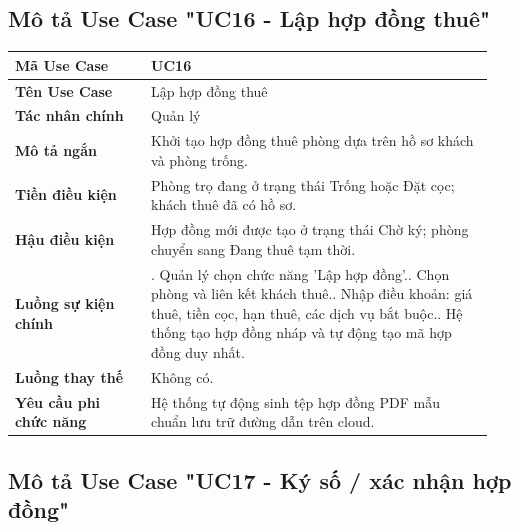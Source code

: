 \subsection{Mô tả Use Case "UC16 - Lập hợp đồng thuê"}

\begin{longtable}[]{@{}>{\RaggedRight\arraybackslash}p{0.27\linewidth}>{\RaggedRight\arraybackslash}p{0.68\linewidth}@{}}
\toprule
\textbf{Mã Use Case} & UC16\tabularnewline
\midrule
\endhead
\textbf{Tên Use Case} & Lập hợp đồng thuê\tabularnewline
\textbf{Tác nhân chính} & Quản lý\tabularnewline
\textbf{Mô tả ngắn} & Khởi tạo hợp đồng thuê phòng dựa trên hồ sơ khách
và phòng trống.\tabularnewline
\textbf{Tiền điều kiện} & Phòng trọ đang ở trạng thái Trống hoặc Đặt
cọc; khách thuê đã có hồ sơ.\tabularnewline
\textbf{Hậu điều kiện} & Hợp đồng mới được tạo ở trạng thái Chờ ký;
phòng chuyển sang Đang thuê tạm thời.\tabularnewline
\textbf{Luồng sự kiện chính} & 1. Quản lý chọn chức
năng 'Lập hợp đồng'.\newline 2. Chọn phòng và liên kết khách
thuê.\newline 3. Nhập điều khoản: giá thuê, tiền cọc, hạn thuê, các
dịch vụ bắt buộc.\newline 4. Hệ thống tạo hợp đồng nháp và tự động
tạo mã hợp đồng duy nhất.\tabularnewline
\textbf{Luồng thay thế} & Không có.\tabularnewline
\textbf{Yêu cầu phi chức năng} & Hệ thống tự động sinh tệp hợp đồng PDF
mẫu chuẩn lưu trữ đường dẫn trên cloud.\tabularnewline
\bottomrule
\end{longtable}

\subsection{Mô tả Use Case "UC17 - Ký số / xác nhận hợp đồng"}

